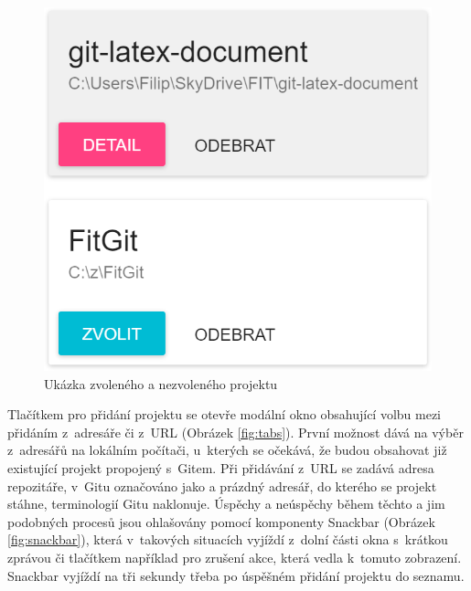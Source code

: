 \FloatBarrier
\begin{figure}[ht]
	\centering
	\includegraphics[scale=0.5]{sections/ui/images/projects.png}
	\caption[Projekty]{Ukázka zvoleného a nezvoleného projektu}
	\label{fig:projects}
\end{figure}
\FloatBarrier

Tlačítkem pro přidání projektu se otevře modální okno obsahující volbu mezi přidáním z~adresáře či z~URL (Obrázek \ref{fig:tabs}). První možnost dává na výběr z~adresářů na lokálním počítači, u~kterých se očekává, že budou obsahovat již existující projekt propojený s~Gitem. Při přidávání z~URL se zadává adresa repozitáře, v~Gitu označováno jako  a prázdný adresář, do kterého se projekt stáhne, terminologií Gitu naklonuje. Úspěchy a neúspěchy během těchto a jim podobných procesů jsou ohlašovány pomocí komponenty Snackbar (Obrázek \ref{fig:snackbar}), která v~takových situacích vyjíždí z~dolní části okna s~krátkou zprávou či tlačítkem například pro zrušení akce, která vedla k~tomuto zobrazení. Snackbar vyjíždí na tři sekundy třeba po úspěšném přidání projektu do seznamu.

